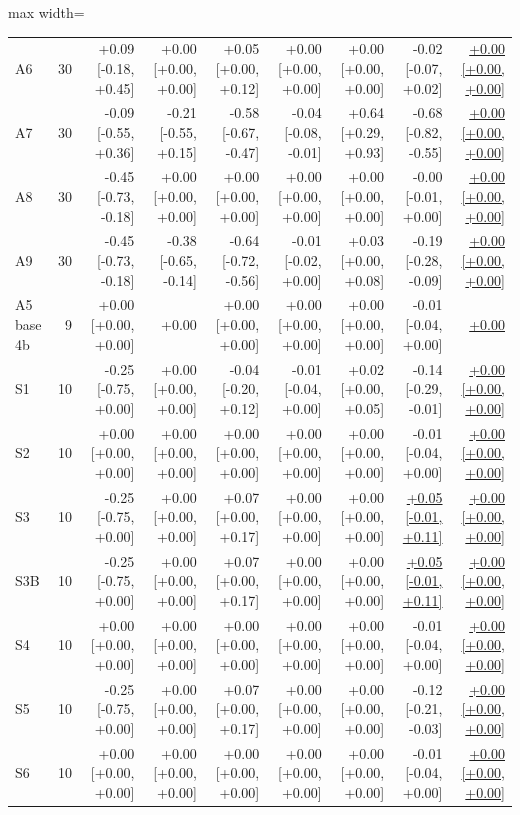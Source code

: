 \begin{table}[t]
\begin{adjustbox}{max width=\textwidth}
\begin{tabular}{@{}lrrrrrrrr@{}}
A6 & 30 & +0.09 [-0.18, +0.45] & +0.00 [+0.00, +0.00] & +0.05 [+0.00, +0.12] & +0.00 [+0.00, +0.00] & +0.00 [+0.00, +0.00] & -0.02 [-0.07, +0.02] & \underline{+0.00 [+0.00, +0.00]} \\
A7 & 30 & -0.09 [-0.55, +0.36] & -0.21 [-0.55, +0.15] & -0.58 [-0.67, -0.47] & -0.04 [-0.08, -0.01] & +0.64 [+0.29, +0.93] & -0.68 [-0.82, -0.55] & \underline{+0.00 [+0.00, +0.00]} \\
A8 & 30 & -0.45 [-0.73, -0.18] & +0.00 [+0.00, +0.00] & +0.00 [+0.00, +0.00] & +0.00 [+0.00, +0.00] & +0.00 [+0.00, +0.00] & -0.00 [-0.01, +0.00] & \underline{+0.00 [+0.00, +0.00]} \\
A9 & 30 & -0.45 [-0.73, -0.18] & -0.38 [-0.65, -0.14] & -0.64 [-0.72, -0.56] & -0.01 [-0.02, +0.00] & +0.03 [+0.00, +0.08] & -0.19 [-0.28, -0.09] & \underline{+0.00 [+0.00, +0.00]} \\
A5 base 4b & 9 & +0.00 [+0.00, +0.00] & +0.00 & +0.00 [+0.00, +0.00] & +0.00 [+0.00, +0.00] & +0.00 [+0.00, +0.00] & -0.01 [-0.04, +0.00] & \underline{+0.00} \\
S1 & 10 & -0.25 [-0.75, +0.00] & +0.00 [+0.00, +0.00] & -0.04 [-0.20, +0.12] & -0.01 [-0.04, +0.00] & +0.02 [+0.00, +0.05] & -0.14 [-0.29, -0.01] & \underline{+0.00 [+0.00, +0.00]} \\
S2 & 10 & +0.00 [+0.00, +0.00] & +0.00 [+0.00, +0.00] & +0.00 [+0.00, +0.00] & +0.00 [+0.00, +0.00] & +0.00 [+0.00, +0.00] & -0.01 [-0.04, +0.00] & \underline{+0.00 [+0.00, +0.00]} \\
S3 & 10 & -0.25 [-0.75, +0.00] & +0.00 [+0.00, +0.00] & +0.07 [+0.00, +0.17] & +0.00 [+0.00, +0.00] & +0.00 [+0.00, +0.00] & \underline{+0.05 [-0.01, +0.11]} & \underline{+0.00 [+0.00, +0.00]} \\
S3B & 10 & -0.25 [-0.75, +0.00] & +0.00 [+0.00, +0.00] & +0.07 [+0.00, +0.17] & +0.00 [+0.00, +0.00] & +0.00 [+0.00, +0.00] & \underline{+0.05 [-0.01, +0.11]} & \underline{+0.00 [+0.00, +0.00]} \\
S4 & 10 & +0.00 [+0.00, +0.00] & +0.00 [+0.00, +0.00] & +0.00 [+0.00, +0.00] & +0.00 [+0.00, +0.00] & +0.00 [+0.00, +0.00] & -0.01 [-0.04, +0.00] & \underline{+0.00 [+0.00, +0.00]} \\
S5 & 10 & -0.25 [-0.75, +0.00] & +0.00 [+0.00, +0.00] & +0.07 [+0.00, +0.17] & +0.00 [+0.00, +0.00] & +0.00 [+0.00, +0.00] & -0.12 [-0.21, -0.03] & \underline{+0.00 [+0.00, +0.00]} \\
S6 & 10 & +0.00 [+0.00, +0.00] & +0.00 [+0.00, +0.00] & +0.00 [+0.00, +0.00] & +0.00 [+0.00, +0.00] & +0.00 [+0.00, +0.00] & -0.01 [-0.04, +0.00] & \underline{+0.00 [+0.00, +0.00]} \\

\end{tabular}
\end{adjustbox}
\end{table}
